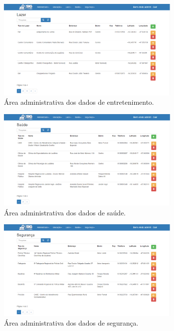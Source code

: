 \begin{figure}[h]
\centering
\includegraphics[width=0.80\textwidth]{./img/cap_IV/20-AdmLazer}
\caption{Área administrativa dos dados de entretenimento.}
\label{fig:AdmLazer}
\end{figure}

\newpage

\begin{figure}[h]
\centering
\includegraphics[width=0.80\textwidth]{./img/cap_IV/21-AdmSaude}
\caption{Área administrativa dos dados de saúde.}
\label{fig:AdmSaude}
\end{figure}

\begin{figure}[h]
\centering
\includegraphics[width=0.80\textwidth]{./img/cap_IV/22-AdmSeguranca}
\caption{Área administrativa dos dados de segurança.}
\label{fig:AdmSeguranca}
\end{figure}

